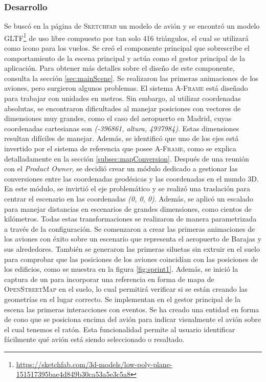 \documentclass[a4paper, 11pt]{book}
\begin{document}
\subsubsection{Desarrollo}
Se buscó en la página de \textsc{Sketchfab} un modelo de avión y se encontró un modelo \textsc{GLTF}\footnote{\url{https://sketchfab.com/3d-models/low-poly-plane-151517395bae4d849b30ca53a5e3c5a8}} de uso libre compuesto por tan solo 416 triángulos, el cual se utilizará como icono para los vuelos.
Se creó el componente principal que sobrescribe el comportamiento de la escena principal y actúa como el gestor principal de la aplicación. Para obtener más detalles sobre el diseño de este componente, consulta la sección \ref{sec:mainScene}.
Se realizaron las primeras animaciones de los aviones, pero surgieron algunos problemas. El sistema \textsc{A-Frame} está diseñado para trabajar con unidades en metros. Sin embargo, al utilizar coordenadas absolutas, se encontraron dificultades al manejar posiciones con vectores de dimensiones muy grandes, como el caso del aeropuerto en Madrid, cuyas coordenadas cartesianas son \emph{(-396861, altura, 4937984)}. Estas dimensiones resultan difíciles de manejar. Además, se identificó que uno de los ejes está invertido por el sistema de referencia que posee \textsc{A-Frame}, como se explica detalladamente en la sección \ref{subsec:mapConversion}.
Después de una reunión con el \emph{Product Owner}, se decidió crear un módulo dedicado a gestionar las conversiones entre las coordenadas geodésicas y las coordenadas en el mundo \textsc{\gls{3D}}. En este módulo, se invirtió el eje problemático y se realizó una traslación para centrar el escenario en las coordenadas \emph{(0, 0, 0)}. Además, se aplicó un escalado para manejar distancias en escenarios de grandes dimensiones, como cientos de kilómetros. Todas estas transformaciones se realizaron de manera parametrizada a través de la configuración.
Se comenzaron a crear las primeras animaciones de los aviones con éxito sobre un escenario que representa el aeropuerto de Barajas y sus alrededores. 
También se generaron las primeras siluetas sin extruir en el suelo para comprobar que las posiciones de los aviones coincidían con las posiciones de los edificios, como se muestra en la figura \ref{fig:sprint1}.
Además, se inició la captura de un \emph{} para incorporar una referencia en forma de mapa de \textsc{OpenStreetMap} en el suelo, lo cual permitirá verificar si se están creando las geometrías en el lugar correcto.
Se implementan en el gestor principal de la escena las primeras interacciones con eventos. Se ha creado una entidad en forma de cono que se posiciona encima del avión para indicar visualmente el avión sobre el cual tenemos el ratón. Esta funcionalidad permite al usuario identificar fácilmente qué avión está siendo seleccionado o resaltado.
\end{document}
